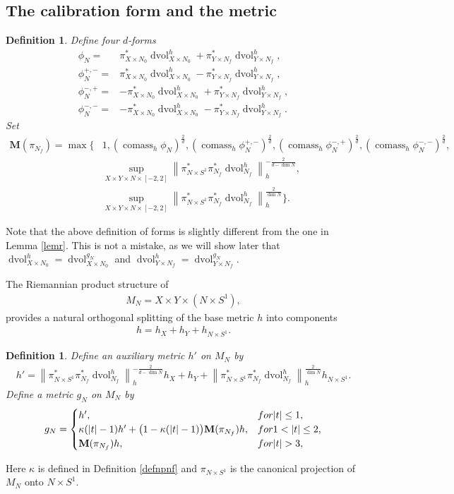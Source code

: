 \documentclass[11pt,a4paper]{amsart}
\numberwithin{equation}{section}
\newcommand{\cms}{\operatorname{comass}}
\newcommand{\ms}{\mathbf{M}}
\newcommand{\s}{\subset}
\newcommand{\no}[1]{\left\lVert#1\right\rVert}
\newcommand{\dvol}{\operatorname{dvol}}
\newcommand{\du}{^\ast}
\newcommand{\ka}{\kappa}
\newcommand{\pxn}{\pi_{X\times N_0}}
\newcommand{\pyn}{\pi_{Y\times N_f}}
\newcommand{\dvx}{\dvol_{X\times N_0}^{g_N}}
\newcommand{\dvy}{\dvol_{Y\times N_f}^{g_N}}
\theoremstyle{plain}
\newtheorem{defn}[exam]{Definition}
\theoremstyle{definition}
\numberwithin{equation}{subsection}
\begin{document}
\subsection{The calibration form and the metric}\label{secconmet}
\begin{defn}
Define four $d$-forms
\begin{align*}
\phi_N=&\pxn\du\dvol^h_{X\times N_0}+\pyn\du\dvol^h_{Y\times N_f},\\	\phi_N^{+,-}=&\pxn\du\dvol^h_{X\times N_0}-\pyn\du\dvol^h_{Y\times N_f},\\
	\phi_N^{-,+}=&-\pxn\du\dvol^h_{X\times N_0}+\pyn\du\dvol^h_{Y\times N_f},\\
	\phi_N^{-,-}=&-\pxn\du\dvol^h_{X\times N_0}-\pyn\du\dvol^h_{Y\times N_f}.
\end{align*}
Set
\begin{align}
\label{mnf}\ms(\pi_{N_f})=\max\bigg\{&1,(\cms_h\phi_N)^{\frac{2}{d}},(\cms_h\phi^{+,-}_N)^{\frac{2}{d}},(\cms_h\phi^{-,+}_N)^{\frac{2}{d}},(\cms_h\phi^{-,-}_N)^{\frac{2}{d}},\\&\sup_{X\times Y\times N\times[-2,2]}\no{\pi_{N\times S^1}\du\pi_{N_f}\du \dvol_{N_f}^h}_h^{-\frac{2}{d-\dim N}},\\&\sup_{X\times Y\times N\times[-2,2]}\no{\pi_{N\times S^1}\du\pi_{N_f}\du \dvol_{N_f}^h}_h^{\frac{2}{\dim N}}\bigg\}.\end{align}
\end{defn}
Note that the above definition of forms is slightly different from the one in Lemma \ref{lemr}. This is not a mistake, as we will show later that $\dvol^h_{X\times N_0}=\dvx$ and $\dvol^h_{Y\times N_f}=\dvy.$

 The Riemannian product structure of 
\begin{align*}
M_N=X\times Y\times(N\times S^1),
\end{align*}
provides a natural orthogonal splitting of the base metric $h$ into components
\begin{align*}
h=h_X+h_Y+h_{N\times S^1}.
\end{align*}
\begin{defn}\label{defngn}
Define an auxiliary metric $h'$ on $M_N$ by
\begin{align*}
h'=\no{\pi_{N\times S^1}\du\pi_{N_f}\du \dvol_{N_f}^h}_h^{-\frac{2}{d-\dim N}}h_X+h_Y+\no{\pi_{N\times S^1}\du\pi_{N_f}\du \dvol_{N_f}^h}_h^{\frac{2}{\dim N}}h_{N\times S^1}.
\end{align*}
Define a metric $g_N$ on $M_N$ by
\begin{align*}
g_N=\begin{cases}
h',&\textnormal{for }|t|\le 1,\\
\ka(|t|-1)h'+\big(1-\ka(|t|-1)\big)\ms(\pi_{N_f})h,&\textnormal{for }1<|t|\le 2,\\
\ms(\pi_{N_f})h,&\textnormal{for }|t|> 3,
\end{cases}
\end{align*}
\end{defn}
Here $\ka$ is defined in Definition \ref{defnpnf} and $\pi_{N\times S^1}$ is the canonical projection of $M_N$ onto $N\times S^1.$ 
\end{document}
